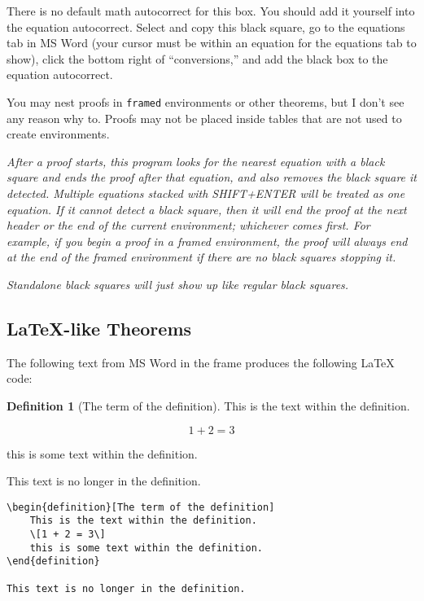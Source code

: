 \documentclass[12pt]{article}
\theoremstyle{plain}
\theoremstyle{remark}
\theoremstyle{definition}
\newtheorem{definition}{Definition}[section]
\begin{document}
There is no default math autocorrect for this box. You should add it
yourself into the equation autocorrect. Select and copy this black
square, go to the equations tab in MS Word (your cursor must be within
an equation for the equations tab to show), click the bottom right of
``conversions,'' and add the black box to the equation autocorrect.

You may nest proofs in \texttt{framed} environments or other theorems,
but I don't see any reason why to. Proofs may not be placed inside
tables that are not used to create environments.

\emph{After a proof starts, this program looks for the nearest equation
with a black square and ends the proof after that equation, and also
removes the black square it detected. Multiple equations stacked with
SHIFT+ENTER will be treated as one equation. If it cannot detect a black
square, then it will end the proof at the next header or the end of the
current environment; whichever comes first. For example, if you begin a
proof in a framed environment, the proof will always end at the end of
the framed environment if there are no black squares stopping it.}

\emph{Standalone black squares will just show up like regular black
squares.}


\subsection{LaTeX-like Theorems}

The following text from MS Word in the frame produces the following
LaTeX code:

\begin{framed}

\begin{definition}[The term of the definition]
This is the text
within the definition.

\[1 + 2 = 3\]

this is some text within the definition.
\end{definition}

This text is no longer in the definition.

\end{framed}



\begin{verbatim}
\begin{definition}[The term of the definition]
    This is the text within the definition.
    \[1 + 2 = 3\]
    this is some text within the definition.
\end{definition}

This text is no longer in the definition.
\end{verbatim}
\end{document}
